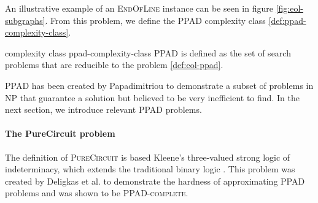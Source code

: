 An illustrative example of an \textsc{EndOfLine} instance can be seen in figure \ref{fig:eol-subgraphs}.
From this problem, we define the \textsc{PPAD} complexity class \ref{def:ppad-complexity-class}.

\begin{definitionbox}{ complexity class \cite{papadimitriou_ComplexityParityArgument_1994}}{ppad-complexity-class}
	\textsc{PPAD} is defined as the set of search problems that
	are reducible to the  problem \ref{def:eol-ppad}.
\end{definitionbox}

\textsc{PPAD} has been created by Papadimitriou \cite{papadimitriou_ComplexityParityArgument_1994}
to demonstrate a subset of problems in \textsc{NP} that guarantee
a solution but believed to be very inefficient to find.
In the next section,
we introduce relevant \textsc{PPAD} problems.

\paragraph{The PureCircuit problem}
\label{par:pure-circ-def}

The definition of \textsc{PureCircuit} is based Kleene's three-valued strong logic of indeterminacy,
which extends the traditional binary logic \cite{kleene_IntroductionMetamathematics_2009}.
This problem was created by Deligkas et al. \cite{deligkas_PureCircuitTightInapproximability_2024}
to demonstrate the hardness of approximating \textsc{PPAD} problems and was shown to be \textsc{PPAD-complete}.


